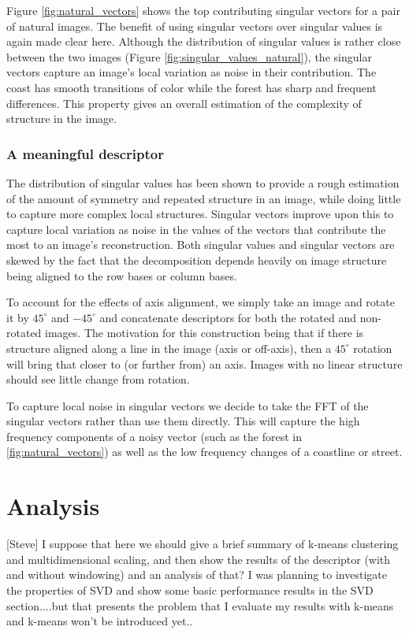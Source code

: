 \documentclass{report}
\begin{document}
Figure \ref{fig:natural_vectors} shows the top contributing singular vectors for a pair of natural images. The benefit of using singular vectors over singular values is again made clear here. Although the distribution of singular values is rather close between the two images (Figure \ref{fig:singular_values_natural}), the singular vectors capture an image's local variation as noise in their contribution. The coast has smooth transitions of color while the forest has sharp and frequent differences. This property gives an overall estimation of the complexity of structure in the image.

\subsection{A meaningful descriptor}

The distribution of singular values has been shown to provide a rough estimation of the amount of symmetry and repeated structure in an image, while doing little to capture more complex local structures. Singular vectors improve upon this to capture local variation as noise in the values of the vectors that contribute the most to an image's reconstruction. Both singular values and singular vectors are skewed by the fact that the decomposition depends heavily on image structure being aligned to the row bases or column bases.

To account for the effects of axis alignment, we simply take an image and rotate it by $45^\circ$ and $-45^\circ$ and concatenate descriptors for both the rotated and non-rotated images. The motivation for this construction being that if there is structure aligned along a line in the image (axis or off-axis), then a $45^\circ$ rotation will bring that closer to (or further from) an axis. Images with no linear structure should see little change from rotation.

To capture local noise in singular vectors we decide to take the FFT of the singular vectors rather than use them directly. This will capture the high frequency components of a noisy vector (such as the forest in \ref{fig:natural_vectors}) as well as the low frequency changes of a coastline or street.

\chapter{Analysis}

[Steve] I suppose that here we should give a brief summary of k-means clustering and multidimensional scaling, and then show the results of the descriptor (with and without windowing) and an analysis of that? I was planning to investigate the properties of SVD and show some basic performance results in the SVD section....but that presents the problem that I evaluate my results with k-means and k-means won't be introduced yet..
\end{document}
